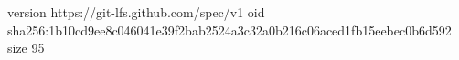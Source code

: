 version https://git-lfs.github.com/spec/v1
oid sha256:1b10cd9ee8c046041e39f2bab2524a3c32a0b216c06aced1fb15eebec0b6d592
size 95
